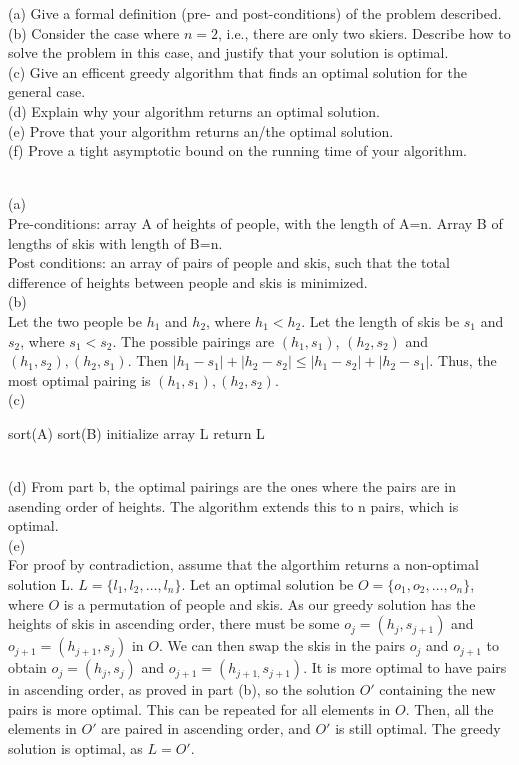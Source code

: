 \documentclass{assignment}
\begin{document}
\begin{problemlist}
\begin{problem}
(a) Give a formal definition (pre- and post-conditions) of the problem described.\\
(b) Consider the case where $n=2$, i.e., there are only two skiers. Describe how to solve the problem in this case, and justify that your solution is optimal.\\
(c) Give an efficent greedy algorithm that finds an optimal solution for the general case.\\
(d) Explain why your algorithm returns an optimal solution.\\
(e) Prove that your algorithm returns an/the optimal solution.\\
(f) Prove a tight asymptotic bound on the running time of your algorithm.\\
\end{problem}
\begin{answer}
\\
(a) \\
Pre-conditions: array A of heights of people, with the length of A=n. Array B of lengths of skis with length of B=n. \\
Post conditions: an array of pairs of people and skis, such that the total difference of heights between people and skis is minimized.\\
(b) \\
Let the two people be $h_1$ and $h_2$, where $h_1 < h_2$. Let the length of skis be $s_1$ and $s_2$, where $s_1 < s_2$. The possible pairings are $(h_1, s_1)$, $(h_2, s_2)$ and $(h_1, s_2), (h_2, s_1)$. Then $|h_1 - s_1| + |h_2 - s_2| \le |h_1 - s_2| + |h_2 - s_1|$. Thus, the most optimal pairing is $(h_1, s_1), (h_2, s_2)$.\\
(c) 
\begin {algorithm}
sort(A)\;
sort(B)\;
initialize array L\;
return L\;
\end {algorithm}
\\
(d) From part b, the optimal pairings are the ones where the pairs are in asending order of heights. The algorithm extends this to n pairs, which is optimal.\\
(e)\\
For proof by contradiction, assume that the algorthim returns a non-optimal solution L. $L = \{l_1,l_2,\ldots,l_n\}$. Let an optimal solution be $O = \{o_1,o_2,\ldots,o_n\}$, where $O$ is a permutation of people and skis. As our greedy solution has the heights of skis in ascending order, there must be some $o_j=(h_j, s_{j+1})$ and $o_{j+1}=(h_{j+1}, s_j)$ in $O$. We can then swap the skis in the pairs $o_j$ and $o_{j+1}$ to obtain $o_j=(h_j, s_j)$ and $o_{j+1}=(h_{j+1,} s_{j+1})$. It is more optimal to have pairs in ascending order, as proved in part (b), so the solution $O'$ containing the new pairs is more optimal. This can be repeated for all elements in $O$. Then, all the elements in $O'$ are paired in ascending order, and $O'$ is still optimal. The greedy solution is optimal, as $L = O'$.\\

\end{answer}
\end{problemlist}
\end{document}
